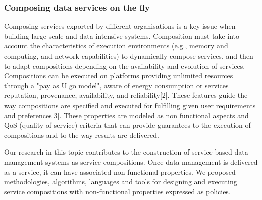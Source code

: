 \subsubsection{Composing data services on the fly }

Composing services  exported by different organisations is a key issue when building  large scale and data-intensive systems. 
Composition must take into account the characteristics of  execution environments (e.g., memory and computing, and network capabilities) to dynamically  compose  services, and then to adapt  compositions depending on the availability and evolution of services. 
 Compositions can be executed  on platforms providing  unlimited resources through a "pay as U go model", aware of energy consumption or services reputation, provenance, availability, and reliability[2].  These features  guide the way compositions are specified and executed for fulfilling given user requirements and preferences[3]. These properties are modeled as  non functional aspects and QoS (quality of service) criteria  that can provide guarantees to the execution of compositions and to the way results are delivered.

Our research in this topic contributes to the construction of service based data management systems as service compositions. Once data management is delivered as a service, it can have associated non-functional properties.
We proposed methodologies, algorithms, languages and tools for designing and executing  service compositions with non-functional properties expressed as policies. 

